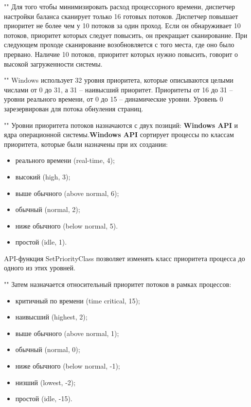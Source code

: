 ""\newline 
\noindent Для того чтобы минимизировать расход процессорного времени, диспетчер настройки баланса сканирует только 16 готовых потоков. Диспетчер повышает приоритет не более чем у 10 потоков за один проход. Если он обнаруживает 10 потоков, приоритет которых следует повысить, он прекращает сканирование. При следующем проходе сканирование возобновляется с того места, где оно было прервано. Наличие 10 потоков, приоритет которых нужно повысить, говорит о высокой загруженности системы.

""\newline 
\noindent Windows использует 32 уровня приоритета, которые описываются целыми числами от 0 до 31, а 31 -- наивысший приоритет. Приоритеты от 16 до 31 -- уровни реального времени, от 0 до 15 -- динамические уровни. Уровень 0 зарезервирован для потока обнуления страниц.

""\newline
\noindent Уровни приоритета потоков назначаются с двух позиций: \textbf{Windows API} и ядра операционной системы.\textbf{Windows API} сортирует процессы по классам приоритета, которые были назначены при их создании:

\begin{itemize}
    \item реального времени (real-time, 4);
    \item высокий (high, 3);
    \item выше обычного (above normal, 6);
    \item обычный (normal, 2);
    \item ниже обычного (below normal, 5).
    \item простой (idle, 1).
\end{itemize}

\noindent API-функция SetPriorityClass позволяет изменять класс приоритета процесса до одного из этих уровней.

""\newline
\noindent Затем назначается относительный приоритет потоков в рамках процессов:

\begin{itemize} 
    \item критичный по времени (time critical, 15);
    \item наивысший (highest, 2);
    \item выше обычного (above normal, 1);
    \item обычный (normal, 0);
    \item ниже обычного (below normal, -1);
    \item низший (lowest, -2);
    \item простой (idle, -15).
\end{itemize} 

